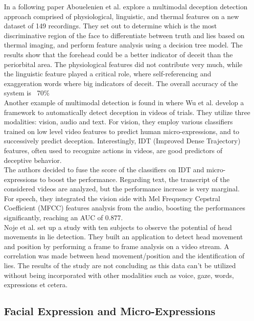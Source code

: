In a following paper \cite{7782429} Abouelenien et al. explore a multimodal deception detection approach comprised of physiological, linguistic, and thermal features on a new dataset of 149 recordings. They set out to determine which is the most discriminative region of the face to differentiate between truth and lies based on thermal imaging, and perform feature analysis using a decision tree model. The results show that the forehead could be a better indicator of deceit than the periorbital area. The physiological features did not contribute very much, while the linguistic feature played a critical role, where self-referencing and exaggeration words where big indicators of deceit. The overall accuracy of the system is ~70\%\\

Another example of multimodal detection is found in \cite{DBLP:journals/corr/abs-1712-04415} where Wu et al. develop a framework to automatically detect deception in videos of trials. They utilize three modalities: vision, audio and text. For vision, they employ various classifiers trained on low level video features to predict human micro-expressions, and to successively predict deception. Interestingly, IDT (Improved Dense Trajectory) features, often used to recognize actions in videos, are good predictors of deceptive behavior. \\
The authors decided to fuse the score of the classifiers on IDT and micro-expressions to boost the performance. Regarding text, the transcript of the considered videos are analyzed, but the performance increase is very marginal. \\
For speech, they integrated the vision side with Mel Frequency Cepstral Coefficient (MFCC) features analysis from the audio, boosting the performances significantly, reaching an AUC of 0.877. \\

Noje et al. \cite{7367432} set up a study with ten subjects to observe the potential of head movements in lie detection. They built an application to detect head movement and position by performing a frame to frame analysis on a video stream. A correlation was made between head movement/position and the identification of lies. The results of the study are not concluding as this data can't be utilized without being incorporated with other modalities such as voice, gaze, words, expressions et cetera.

\subsection*{Facial Expression and Micro-Expressions}

